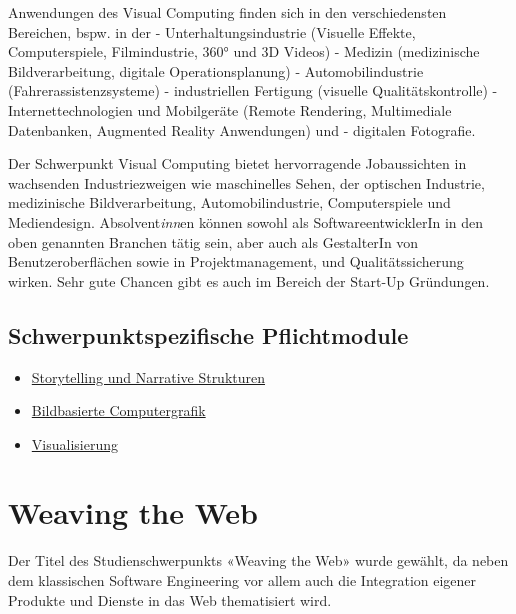 Anwendungen des Visual Computing finden sich in den verschiedensten
Bereichen, bspw. in der - Unterhaltungsindustrie (Visuelle Effekte,
Computerspiele, Filmindustrie, 360° und 3D Videos) - Medizin
(medizinische Bildverarbeitung, digitale Operationsplanung) -
Automobilindustrie (Fahrerassistenzsysteme) - industriellen Fertigung
(visuelle Qualitätskontrolle) - Internettechnologien und Mobilgeräte
(Remote Rendering, Multimediale Datenbanken, Augmented Reality
Anwendungen) und - digitalen Fotografie.

Der Schwerpunkt Visual Computing bietet hervorragende Jobaussichten in
wachsenden Industriezweigen wie maschinelles Sehen, der optischen
Industrie, medizinische Bildverarbeitung, Automobilindustrie,
Computerspiele und Mediendesign. Absolvent\emph{inn}en können sowohl als
SoftwareentwicklerIn in den oben genannten Branchen tätig sein, aber
auch als GestalterIn von Benutzeroberflächen sowie in Projektmanagement,
und Qualitätssicherung wirken. Sehr gute Chancen gibt es auch im Bereich
der Start-Up Gründungen.

\section*{Schwerpunktspezifische
Pflichtmodule\label{/mi-2017/modulbeschreibungen-master/schwerpunkt-visual-computing}}\label{schwerpunktspezifische-pflichtmodulepathlabelmi-2017modulbeschreibungen-masterschwerpunkt-visual-computing}

\begin{itemize}
\tightlist
\item
  \hyperref[/mi-2017/modulbeschreibungen-master/MA_VC_Modul_Storytelling]{Storytelling
  und Narrative Strukturen}
\item
  \hyperref[/mi-2017/modulbeschreibungen-master/MA_VC_Modul_BildbasierteComputergrafik]{Bildbasierte
  Computergrafik}
\item
  \hyperref[/mi-2017/modulbeschreibungen-master/MA_VC_Modul_Visualisierung]{Visualisierung}
\end{itemize}

\chapter{Weaving the
Web\label{/mi-2017/modulbeschreibungen-master/schwerpunkt-weaving-the-web}}\label{weaving-the-webpathlabelmi-2017modulbeschreibungen-masterschwerpunkt-weaving-the-web}

Der Titel des Studienschwerpunkts «Weaving the Web» wurde gewählt, da
neben dem klassischen Software Engineering vor allem auch die
Integration eigener Produkte und Dienste in das Web thematisiert wird.

